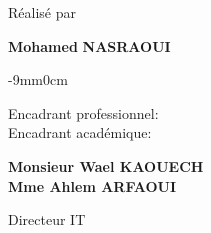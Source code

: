 \begin{center}
\textrm{Réalisé par}\\
\vskip0.3cm
        \begin{center}
            \large\textbf{Mohamed}
            \large\textbf{NASRAOUI }
        \end{center}
    

\vskip12mm


\begin{changemargin}{-9mm}{0cm}
\begin{minipage}[l]{1.1\columnwidth}
\begin{tcolorbox}[colframe=isiBlue,colback=white,boxrule=0pt,toprule=3pt,bottomrule=3pt,arc=0pt,top=0mm,right=0mm,left=0mm,bottom=0mm,boxsep=0.5mm]{
    \begin{tcolorbox}[colframe=isiBlue,colback=white, boxrule=0pt,toprule=1pt,bottomrule=1pt,arc=0pt,enlarge bottom by=-0.9mm, auto outer arc]
        \centering
        {\huge\textbf{\@title}}
    \end{tcolorbox}
}
\end{tcolorbox}
\end{minipage}
\end{changemargin}

\end{center}
\vskip8mm%

\begin{center}
\large
\begin{minipage}[c]{0.28\columnwidth}
Encadrant professionnel:\\
Encadrant académique:
\end{minipage}
\hfill
\begin{minipage}[c]{0.42\columnwidth}
\textbf{Monsieur Wael KAOUECH}\\
\textbf{Mme Ahlem ARFAOUI}
\end{minipage}
\hfill
\begin{minipage}[c]{0.26\columnwidth}
Directeur IT\\
\@academicFramerSpeciality
\end{minipage}
\end{center}
\vskip16mm

\afterpage{\blankpage}